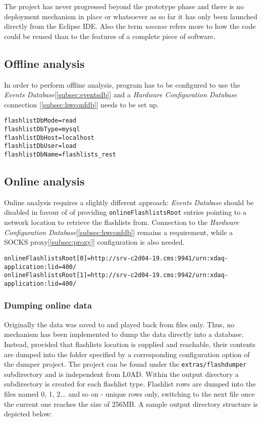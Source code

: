 The project has never progressed beyond the prototype phase and there is no deployment mechanism in place or whatsoever as so far it has only been launched directly from the Eclipse IDE. Also the term \textit{usecase} refers more to how the code could be reused than to the features of a complete piece of software.

\subsection{Offline analysis}
In order to perform offline analysis, program has to be configured to use the \emph{Events Database}[\ref{subsec:eventsdb}] and a \emph{Hardware Configuration Database} connection [\ref{subsec:hwconfdb}] needs to be set up.

\begin{lstlisting}
flashlistDbMode=read
flashlistDbType=mysql
flashlistDbHost=localhost
flashlistDbUser=load
flashlistDbName=flashlists_rest
\end{lstlisting}


\subsection{Online analysis}
Online analysis requires a slightly different approach: \emph{Events Database} should be disabled in favour of of providing \texttt{onlineFlashlistsRoot} entries pointing to a network location to retrieve the flashlists from. 
Connection to the \emph{Hardware Configuration Database}[\ref{subsec:hwconfdb}] remains a requirement, while a SOCKS proxy[\ref{subsec:proxy}] configuration is also needed.

\begin{lstlisting}
onlineFlashlistsRoot[0]=http://srv-c2d04-19.cms:9941/urn:xdaq-application:lid=400/
onlineFlashlistsRoot[1]=http://srv-c2d04-19.cms:9942/urn:xdaq-application:lid=400/
\end{lstlisting}


\subsubsection{Dumping online data}
Originally the data was saved to and played back from files only. Thus, no mechanism has been implemented to dump the data directly into a database. Instead, provided that flashlists location is supplied and reachable, their contents are dumped into the folder specified by a corresponding configuration option of the dumper project. The project can be found under the \texttt{extras/flashdumper} subdirectory and is independent from L0AD.
Within the output directory a subdirectory is created for each flashlist type. Flashlist rows are dumped into the files named 0, 1, 2... and so on - unique rows only, switching to the next file once the current one reaches the size of 256MB. A sample output directory structure is depicted below:

